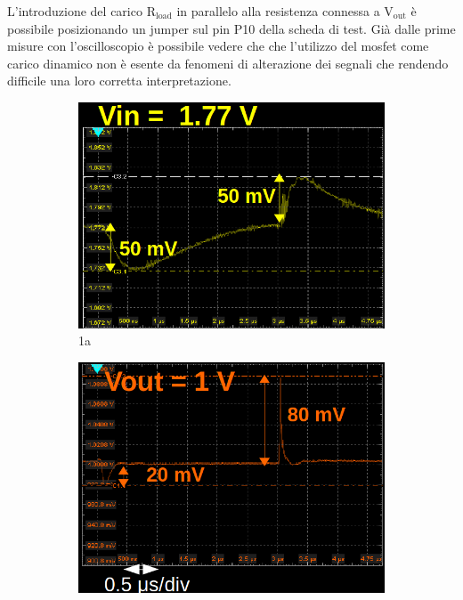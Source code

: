 L'introduzione del carico $\mathrm{R_{load}}$ in parallelo alla resistenza connessa a $\mathrm{V_{out}}$ è possibile posizionando un jumper sul pin P10 della scheda di test.
Già dalle prime misure con l'oscilloscopio è possibile vedere che che l'utilizzo del mosfet come carico dinamico non è esente da fenomeni di alterazione dei segnali che rendendo difficile una loro corretta interpretazione. 
\begin{figure}
\begin{subfigure}{.5\textwidth}
  \centering
  \includegraphics[width=.96\linewidth]{Immagini/zoomTransientTest1}
  \caption{1a}
  \label{TransientTest:sfig1}
\end{subfigure}%
\begin{subfigure}{.5\textwidth}
  \centering
  \includegraphics[width=.95\linewidth]{Immagini/zoomTransientTest2}

\end{subfigure}
\end{figure}
